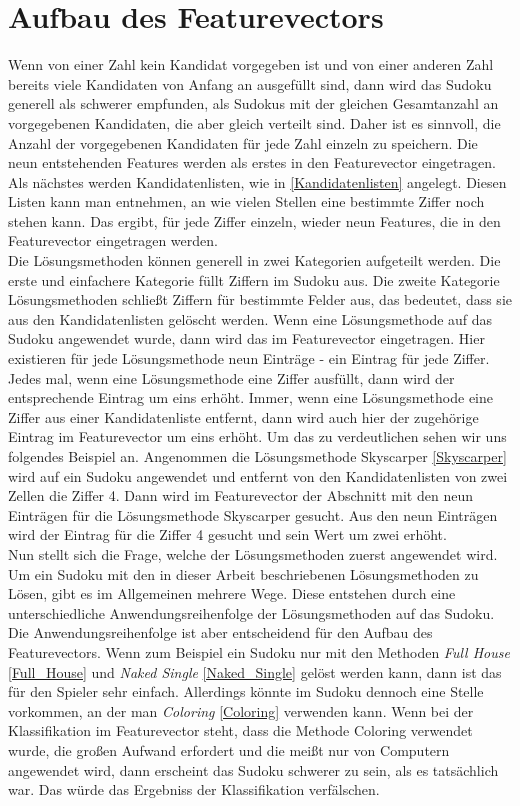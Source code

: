 \section{Aufbau des Featurevectors}
\label{Aufbau}
Wenn von einer Zahl kein Kandidat vorgegeben ist und von einer anderen Zahl bereits viele Kandidaten von Anfang an ausgefüllt sind, dann wird das Sudoku generell als schwerer empfunden, als Sudokus mit der gleichen Gesamtanzahl an vorgegebenen Kandidaten, die aber gleich verteilt sind. Daher ist es sinnvoll, die Anzahl der vorgegebenen Kandidaten für jede Zahl einzeln zu speichern. Die neun entstehenden Features werden als erstes in den Featurevector eingetragen.\\
Als nächstes werden Kandidatenlisten, wie in \ref{Kandidatenlisten} angelegt. Diesen Listen kann man entnehmen, an wie vielen Stellen eine bestimmte Ziffer noch stehen kann. Das ergibt, für jede Ziffer einzeln, wieder neun Features, die in den Featurevector eingetragen werden.\\
Die Lösungsmethoden können generell in zwei Kategorien aufgeteilt werden. Die erste und einfachere Kategorie füllt Ziffern im Sudoku aus. Die zweite Kategorie Lösungsmethoden schließt Ziffern für bestimmte Felder aus, das bedeutet, dass sie aus den Kandidatenlisten gelöscht werden. Wenn eine Lösungsmethode auf das Sudoku angewendet wurde, dann wird das im Featurevector eingetragen. Hier existieren für jede Lösungsmethode neun Einträge - ein Eintrag für jede Ziffer. Jedes mal, wenn eine Lösungsmethode eine Ziffer ausfüllt, dann wird der entsprechende Eintrag um eins erhöht. Immer, wenn eine Lösungsmethode eine Ziffer aus einer Kandidatenliste entfernt, dann wird auch hier der zugehörige Eintrag im Featurevector um eins erhöht. Um das zu verdeutlichen sehen wir uns folgendes Beispiel an. Angenommen die Lösungsmethode Skyscarper \ref{Skyscarper} wird auf ein Sudoku angewendet und entfernt von den Kandidatenlisten von zwei Zellen die Ziffer 4. Dann wird im Featurevector der Abschnitt mit den neun Einträgen für die Lösungsmethode Skyscarper gesucht. Aus den neun Einträgen wird der Eintrag für die Ziffer 4 gesucht und sein Wert um zwei erhöht.\\
Nun stellt sich die Frage, welche der Lösungsmethoden zuerst angewendet wird. Um ein Sudoku mit den in dieser Arbeit beschriebenen Lösungsmethoden zu Lösen, gibt es im Allgemeinen mehrere Wege. Diese entstehen durch eine unterschiedliche Anwendungsreihenfolge der Lösungsmethoden auf das Sudoku. Die Anwendungsreihenfolge ist aber entscheidend für den Aufbau des Featurevectors. Wenn zum Beispiel ein Sudoku nur mit den Methoden \textit{Full House} \ref{Full_House} und \textit{Naked Single} \ref{Naked_Single} gelöst werden kann, dann ist das für den Spieler sehr einfach. Allerdings könnte im Sudoku dennoch eine Stelle vorkommen, an der man \textit{Coloring} \ref{Coloring} verwenden kann. Wenn bei der Klassifikation im Featurevector steht, dass die Methode Coloring verwendet wurde, die großen Aufwand erfordert und die meißt nur von Computern angewendet wird, dann erscheint das Sudoku schwerer zu sein, als es tatsächlich war. Das würde das Ergebniss der Klassifikation verfälschen.\\
